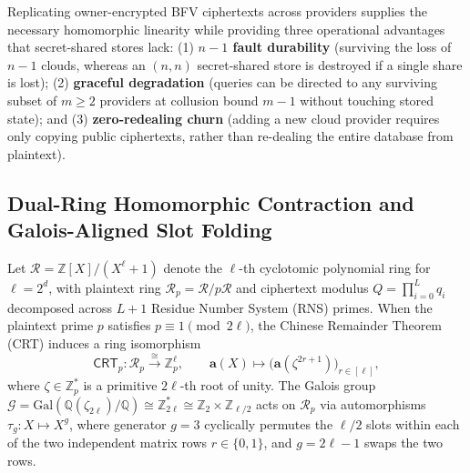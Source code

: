 \documentclass[11pt,a4paper]{article}
\begin{document}
Replicating owner-encrypted BFV ciphertexts across providers supplies the necessary homomorphic linearity while providing three operational advantages that secret-shared stores lack: (1) \textbf{$n-1$ fault durability} (surviving the loss of $n-1$ clouds, whereas an $(n,n)$ secret-shared store is destroyed if a single share is lost); (2) \textbf{graceful degradation} (queries can be directed to any surviving subset of $m \ge 2$ providers at collusion bound $m-1$ without touching stored state); and (3) \textbf{zero-redealing churn} (adding a new cloud provider requires only copying public ciphertexts, rather than re-dealing the entire database from plaintext).

\subsection{Dual-Ring Homomorphic Contraction and Galois-Aligned Slot Folding}\label{sec:dual_ring}

Let $\mathcal{R} = \mathbb{Z}[X]/(X^\ell + 1)$ denote the $\ell$-th cyclotomic polynomial ring for $\ell = 2^d$, with plaintext ring $\mathcal{R}_p = \mathcal{R}/p\mathcal{R}$ and ciphertext modulus $Q = \prod_{i=0}^{L} q_i$ decomposed across $L+1$ Residue Number System (RNS) primes. When the plaintext prime $p$ satisfies $p \equiv 1 \pmod{2\ell}$, the Chinese Remainder Theorem (CRT) induces a ring isomorphism~\cite{halevi2014}
\begin{equation}
    \mathsf{CRT}_p : \mathcal{R}_p \xrightarrow{\;\cong\;} \mathbb{Z}_p^{\ell}, \qquad \mathbf{a}(X) \longmapsto \big(\mathbf{a}(\zeta^{2r+1})\big)_{r \in [\ell]},
\end{equation}
where $\zeta \in \mathbb{Z}_p^*$ is a primitive $2\ell$-th root of unity. The Galois group $\mathcal{G} = \mathrm{Gal}(\mathbb{Q}(\zeta_{2\ell})/\mathbb{Q}) \cong \mathbb{Z}_{2\ell}^* \cong \mathbb{Z}_2 \times \mathbb{Z}_{\ell/2}$ acts on $\mathcal{R}_p$ via automorphisms $\tau_g : X \mapsto X^g$, where generator $g = 3$ cyclically permutes the $\ell/2$ slots within each of the two independent matrix rows $r \in \{0, 1\}$, and $g = 2\ell - 1$ swaps the two rows.
\end{document}
